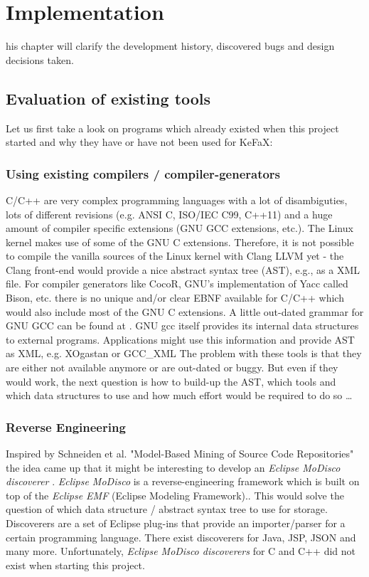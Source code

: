 \section{Implementation}
his chapter will clarify the development history, 
discovered bugs and design decisions taken.

\subsection{Evaluation of existing tools}
Let us first take a look on programs 
which already existed when this project started and 
why they have or have not been used  for KeFaX:

\subsubsection{Using existing compilers / compiler-generators}
C/C++ are very complex programming languages with a lot of disambiguties,
lots of different revisions (e.g. ANSI C, ISO/IEC C99\cite{ISOC99}, C++11) and a 
huge amount of compiler specific extensions
(GNU GCC extensions, etc.). 
The Linux kernel makes use of some of the GNU C extensions.
Therefore, it is not possible to compile the vanilla sources of the Linux kernel with Clang
LLVM yet - the Clang front-end\cite{ClangIntro} would provide a nice abstract syntax tree (AST), 
e.g., as a XML file. For compiler generators like CocoR\cite{COCOR}, 
GNU's implementation of Yacc called Bison\cite{Bison}, etc. there is no unique 
and/or clear EBNF available for C/C++ which would also include most of the GNU C extensions.
A little out-dated grammar  for GNU GCC can be found at \cite{GNUCEBNF}.
GNU gcc itself provides its internal data structures to external programs.
Applications might use this information and provide AST as XML, e.g.
XOgastan\cite{XOgastan} or 
GCC\_XML \cite{gccxml}
The problem with these tools is that they are either not available anymore or are out-dated or buggy.
But even if they would work, the next question is how to build-up the AST, 
which tools and which data structures to use and how much effort would be required to do so \dots

\subsubsection{Reverse Engineering}
Inspired by Schneiden et al. "Model-Based Mining of Source Code Repositories"
\cite{scheidgen2014model} the idea came up that it might be interesting to develop
an {\it Eclipse MoDisco discoverer} \cite{Modisco_1}
\cite{bruneliere2010modisco}
\cite{bruneliere2014modisco}.
{\it Eclipse MoDisco} is a reverse-engineering framework which is built on top of the
{\it Eclipse EMF} (Eclipse Modeling Framework)..
This would solve the question of which data structure / abstract syntax tree
to use for storage.
Discoverers are a set of Eclipse plug-ins that provide an importer/parser for a 
certain programming language.
There exist discoverers for Java, JSP, JSON and many more.
Unfortunately, {\it Eclipse MoDisco discoverers} for C and C++ 
did not exist when starting this project.


